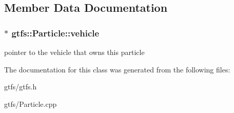 \subsection{Member Data Documentation}
\subsubsection[{\texorpdfstring{vehicle}{vehicle}}]{$\ast$ gtfs\+::\+Particle\+::vehicle}\hypertarget{classgtfs_1_1Particle_a81c313d505ecb592d79463f167dfb76c}{}\label{classgtfs_1_1Particle_a81c313d505ecb592d79463f167dfb76c}
pointer to the vehicle that owns this particle 

The documentation for this class was generated from the following files\+:\begin{DoxyCompactItemize}
\item 
gtfs/gtfs.\+h\item 
gtfs/Particle.\+cpp\end{DoxyCompactItemize}
